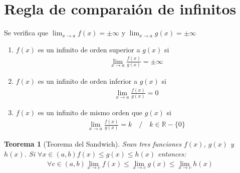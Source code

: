 \documentclass{article}
\newtheorem{sandwich}{Teorema}
\begin{document}
\section{Regla de comparaión de infinitos}
Se verifica que $\lim_{x \to a}f(x)= \pm \infty$ y $\lim_{x \to a} g(x)= \pm \infty$
\begin{enumerate}
    \item $f(x)$ es un infinito de orden superior a $g(x)$ si
    \begin{equation}
        \begin{split}
            \lim_{x \to a} \frac{f(x)}{g(x)} = \pm \infty
        \end{split}
    \end{equation}
    \item $f(x)$ es un infinito de orden inferior a $g(x)$ si
    \begin{equation}
        \begin{split}
            \lim_{x \to a} \frac{f(x)}{g(x)} = 0
        \end{split}
    \end{equation}
    \item $f(x)$ es un infinito de mismo orden que $g(x)$ si
    \begin{equation}
        \begin{split}
            \lim_{x \to a} \frac{f(x)}{g(x)} = k \quad / \quad k \in  \mathbb{R} - \{ 0 \}
        \end{split}
    \end{equation}
\end{enumerate}
\begin{sandwich}[Teorema del Sandwich]
    Sean tres funciones $f(x)$, $g(x)$ y $h(x)$.
    Si $\forall x \in (a,b) f(x) \leq g(x) \leq h(x)$ entonces:
    \begin{equation}
        \begin{split}
            \forall c \in (a,b) \lim_{x \to c} f(x) \leq
            \lim_{x \to c} g(x) \leq \lim_{x \to c} h(x)
        \end{split}
    \end{equation}
\end{sandwich}
\end{document}
